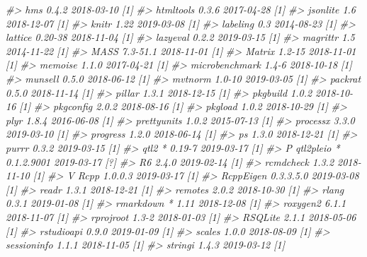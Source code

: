 \documentclass[oneside]{book}\usepackage[]{graphicx}\usepackage[]{color}
\newenvironment{Shaded}{\begin{snugshade}}{\end{snugshade}}
\newcommand{\CommentTok}[1]{\textcolor[rgb]{0.56,0.35,0.01}{\textit{#1}}}
\begin{document}
\begin{Shaded}
\begin{Highlighting}[]
\CommentTok{#>    hms              0.4.2      2018-03-10 [1]}
\CommentTok{#>    htmltools        0.3.6      2017-04-28 [1]}
\CommentTok{#>    jsonlite         1.6        2018-12-07 [1]}
\CommentTok{#>    knitr            1.22       2019-03-08 [1]}
\CommentTok{#>    labeling         0.3        2014-08-23 [1]}
\CommentTok{#>    lattice          0.20-38    2018-11-04 [1]}
\CommentTok{#>    lazyeval         0.2.2      2019-03-15 [1]}
\CommentTok{#>    magrittr         1.5        2014-11-22 [1]}
\CommentTok{#>    MASS             7.3-51.1   2018-11-01 [1]}
\CommentTok{#>    Matrix           1.2-15     2018-11-01 [1]}
\CommentTok{#>    memoise          1.1.0      2017-04-21 [1]}
\CommentTok{#>    microbenchmark   1.4-6      2018-10-18 [1]}
\CommentTok{#>    munsell          0.5.0      2018-06-12 [1]}
\CommentTok{#>    mvtnorm          1.0-10     2019-03-05 [1]}
\CommentTok{#>    packrat          0.5.0      2018-11-14 [1]}
\CommentTok{#>    pillar           1.3.1      2018-12-15 [1]}
\CommentTok{#>    pkgbuild         1.0.2      2018-10-16 [1]}
\CommentTok{#>    pkgconfig        2.0.2      2018-08-16 [1]}
\CommentTok{#>    pkgload          1.0.2      2018-10-29 [1]}
\CommentTok{#>    plyr             1.8.4      2016-06-08 [1]}
\CommentTok{#>    prettyunits      1.0.2      2015-07-13 [1]}
\CommentTok{#>    processx         3.3.0      2019-03-10 [1]}
\CommentTok{#>    progress         1.2.0      2018-06-14 [1]}
\CommentTok{#>    ps               1.3.0      2018-12-21 [1]}
\CommentTok{#>    purrr            0.3.2      2019-03-15 [1]}
\CommentTok{#>    qtl2           * 0.19-7     2019-03-17 [1]}
\CommentTok{#>  P qtl2pleio      * 0.1.2.9001 2019-03-17 [?]}
\CommentTok{#>    R6               2.4.0      2019-02-14 [1]}
\CommentTok{#>    rcmdcheck        1.3.2      2018-11-10 [1]}
\CommentTok{#>  V Rcpp             1.0.0.3    2019-03-17 [1]}
\CommentTok{#>    RcppEigen        0.3.3.5.0  2019-03-08 [1]}
\CommentTok{#>    readr            1.3.1      2018-12-21 [1]}
\CommentTok{#>    remotes          2.0.2      2018-10-30 [1]}
\CommentTok{#>    rlang            0.3.1      2019-01-08 [1]}
\CommentTok{#>    rmarkdown      * 1.11       2018-12-08 [1]}
\CommentTok{#>    roxygen2         6.1.1      2018-11-07 [1]}
\CommentTok{#>    rprojroot        1.3-2      2018-01-03 [1]}
\CommentTok{#>    RSQLite          2.1.1      2018-05-06 [1]}
\CommentTok{#>    rstudioapi       0.9.0      2019-01-09 [1]}
\CommentTok{#>    scales           1.0.0      2018-08-09 [1]}
\CommentTok{#>    sessioninfo      1.1.1      2018-11-05 [1]}
\CommentTok{#>    stringi          1.4.3      2019-03-12 [1]}

\end{Highlighting}
\end{Shaded}
\end{document}

